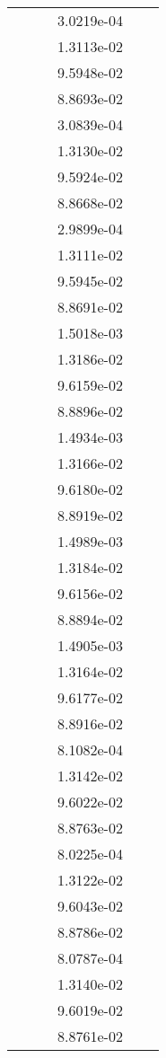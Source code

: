 \begin{xltabular}{\textwidth}{r|rS[table-format=1.3e+2]S[table-format=1.4e+2]S[table-format=1.4e+2]S[table-format=-1.5]}
&  &  & 3.0219e-04 & & \\
&  &  & 1.3113e-02 & & \\
&  &  & 9.5948e-02 & & \\
&  &  & 8.8693e-02 & & \\
&  &  & 3.0839e-04 & & \\
&  &  & 1.3130e-02 & & \\
&  &  & 9.5924e-02 & & \\
&  &  & 8.8668e-02 & & \\
&  &  & 2.9899e-04 & & \\
&  &  & 1.3111e-02 & & \\
&  &  & 9.5945e-02 & & \\
&  &  & 8.8691e-02 & & \\
&  &  & 1.5018e-03 & & \\
&  &  & 1.3186e-02 & & \\
&  &  & 9.6159e-02 & & \\
&  &  & 8.8896e-02 & & \\
&  &  & 1.4934e-03 & & \\
&  &  & 1.3166e-02 & & \\
&  &  & 9.6180e-02 & & \\
&  &  & 8.8919e-02 & & \\
&  &  & 1.4989e-03 & & \\
&  &  & 1.3184e-02 & & \\
&  &  & 9.6156e-02 & & \\
&  &  & 8.8894e-02 & & \\
&  &  & 1.4905e-03 & & \\
&  &  & 1.3164e-02 & & \\
&  &  & 9.6177e-02 & & \\
&  &  & 8.8916e-02 & & \\
&  &  & 8.1082e-04 & & \\
&  &  & 1.3142e-02 & & \\
&  &  & 9.6022e-02 & & \\
&  &  & 8.8763e-02 & & \\
&  &  & 8.0225e-04 & & \\
&  &  & 1.3122e-02 & & \\
&  &  & 9.6043e-02 & & \\
&  &  & 8.8786e-02 & & \\
&  &  & 8.0787e-04 & & \\
&  &  & 1.3140e-02 & & \\
&  &  & 9.6019e-02 & & \\
&  &  & 8.8761e-02 & & \\

\end{xltabular}
